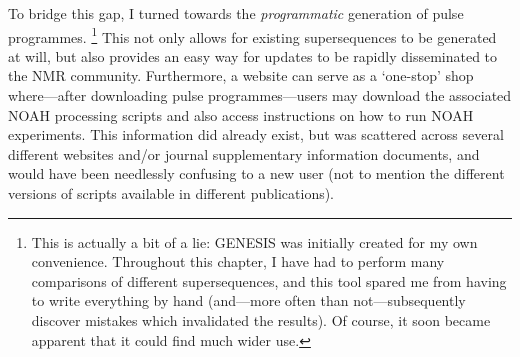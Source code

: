 To bridge this gap, I turned towards the \textit{programmatic} generation of pulse programmes.%
\footnote{This is actually a bit of a lie: GENESIS was initially created for my own convenience. Throughout this chapter, I have had to perform many comparisons of different supersequences, and this tool spared me from having to write everything by hand (and---more often than not---subsequently discover mistakes which invalidated the results). Of course, it soon became apparent that it could find much wider use.}
This not only allows for existing supersequences to be generated at will, but also provides an easy way for updates to be rapidly disseminated to the NMR community.
Furthermore, a website can serve as a `one-stop' shop where---after downloading pulse programmes---users may download the associated NOAH processing scripts and also access instructions on how to run NOAH experiments.
This information did already exist, but was scattered across several different websites and/or journal supplementary information documents, and would have been needlessly confusing to a new user (not to mention the different versions of scripts available in different publications).
